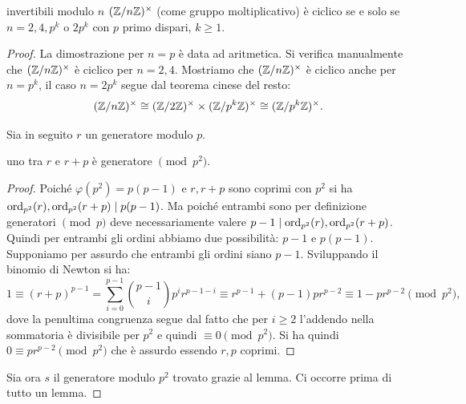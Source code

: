 \begin{proposition}{invertibili modulo $n$}
    $(\mathbb{Z}/n\mathbb{Z})^\times$ (come gruppo moltiplicativo) è ciclico se e solo se $n = 2,4,p^k$ o $2p^k$ con $p$ primo dispari, $k \geq 1$.
\end{proposition}
\begin{proof}
    La dimostrazione per $n = p$ è data ad aritmetica. Si verifica manualmente che $(\mathbb{Z}/n\mathbb{Z})^\times$ è ciclico per $n=2, 4$. Mostriamo che $(\mathbb{Z}/n\mathbb{Z})^\times$ è ciclico anche per $n = p^k$, il caso $n = 2p^k$ segue dal teorema cinese del resto:
    \[
        (\mathbb{Z}/n\mathbb{Z})^\times \cong (\mathbb{Z}/2\mathbb{Z})^\times \times (\mathbb{Z}/p^k\mathbb{Z})^\times \cong (\mathbb{Z}/p^k\mathbb{Z})^\times.
    \]
    
    Sia in seguito $r$ un generatore modulo $p$.
    
    \begin{lemma2}
        uno tra $r$ e $r+p$ è generatore $\pmod{p^2}$.
    \end{lemma2}
    \begin{proof}
        Poiché $\varphi(p^2) = p(p-1)$ e $r,r+p$ sono coprimi con $p^2$ si ha $\text{ord}_{p^2}(r), \text{ord}_{p^2}(r+p) \mid p(p-1)$. Ma poiché entrambi sono per definizione generatori $\pmod{p}$ deve necessariamente valere $p-1  \mid  \text{ord}_{p^2}(r), \text{ord}_{p^2}(r+p)$. Quindi per entrambi gli ordini abbiamo due possibilità: $p-1$ e $p(p-1)$. Supponiamo per assurdo che entrambi gli ordini siano $p-1$. Sviluppando il binomio di Newton si ha:  \[ 1 \equiv (r + p)^{p-1} = \sum_{i=0}^{p-1} \binom{p-1}{i}p^ir^{p-1-i} \equiv r^{p-1} + (p-1)pr^{p-2} \equiv 1 - pr^{p-2} \pmod{p^2}, \]
        dove la penultima congruenza segue dal fatto che per $i\geq 2$ l'addendo nella sommatoria è divisibile per $p^2$ e quindi $\equiv 0 \pmod{p^2}$. Si ha quindi $0 \equiv pr^{p-2} \pmod{p^2}$ che è assurdo essendo $r,p$ coprimi. 
    \end{proof}
    Sia ora $s$ il generatore modulo $p^2$ trovato grazie al lemma. Ci occorre prima di tutto un lemma.
    

\end{proof}
